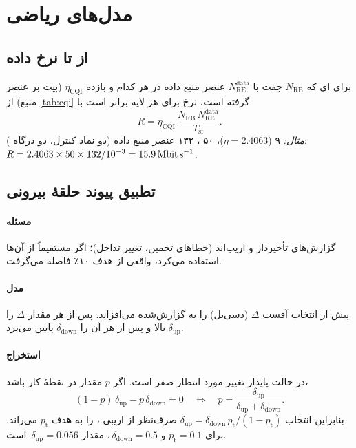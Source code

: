\documentclass[11pt,a4paper]{article}
\begin{document}
\section{مدل‌های ریاضی}

\subsection{از  تا نرخ داده}\label{sec:rate}
برای ای که $N_{\mathrm{RB}}$ جفت  با $N_{\mathrm{RE}}^{\mathrm{data}}$ عنصر منبع داده در هر کدام و
بازده $\eta_{\mathrm{CQI}}$ (بیت بر عنصر منبع) از \cref{tab:cqi} گرفته است، نرخ برای هر لایه برابر است با
\begin{equation}\label{eq:cqirate}
  R = \eta_{\mathrm{CQI}}\,\frac{N_{\mathrm{RB}}\,N_{\mathrm{RE}}^{\mathrm{data}}}{T_{\mathrm{sf}}}.
\end{equation}
\emph{مثال:}  ۹ ($\eta = 2.4063$)، ۵۰ ، ۱۳۲ عنصر منبع داده (دو نماد کنترل، دو درگاه ):
$R = 2.4063\times50\times132/10^{-3} = \qty{15.9}{\mega\bit\per\second}$.

\subsection{تطبیق پیوند حلقهٔ بیرونی}\label{sec:olla}
\paragraph{مسئله} گزارش‌های  تأخیردار و اریب‌اند (خطاهای تخمین، تغییر تداخل)؛ اگر  مستقیماً از
آن‌ها استفاده می‌کرد،  واقعی از هدف ۱۰٪ فاصله می‌گرفت.
\paragraph{مدل}  پیش از انتخاب  آفست $\Delta$ (دسی‌بل) را به  گزارش‌شده می‌افزاید. پس
از هر  مقدار $\Delta$ را $\delta_{\mathrm{up}}$ بالا و پس از هر  آن را $\delta_{\mathrm{down}}$
پایین می‌برد.
\paragraph{استخراج} در حالت پایدار تغییر مورد انتظار صفر است. اگر $p$ مقدار  در نقطهٔ کار باشد،
\begin{equation}\label{eq:olla}
  (1-p)\,\delta_{\mathrm{up}} - p\,\delta_{\mathrm{down}} = 0
  \quad\Longrightarrow\quad
  p = \frac{\delta_{\mathrm{up}}}{\delta_{\mathrm{up}}+\delta_{\mathrm{down}}}.
\end{equation}
بنابراین انتخاب $\delta_{\mathrm{up}} = \delta_{\mathrm{down}}\,p_\mathrm{t}/(1-p_\mathrm{t})$ صرف‌نظر از اریبی ،
 را به هدف $p_\mathrm{t}$ می‌راند. برای $p_\mathrm{t} = 0.1$ و $\delta_{\mathrm{down}} = 0.5$\,، مقدار
$\delta_{\mathrm{up}} = 0.056$\, است.
\end{document}

